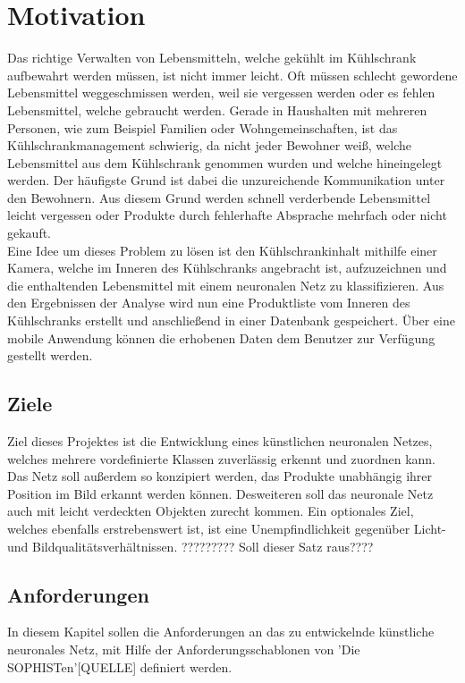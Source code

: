 \documentclass[a4paper,12pt,oneside]{article}
\begin{document}
  \newpage
  
  \tableofcontents
  \newpage
  \listoffigures
 
  
  \newpage
  \pagestyle{plain}
  \setcounter{page}{1}
   
  
  \section{Motivation}
Das richtige Verwalten von Lebensmitteln, welche gekühlt im Kühlschrank aufbewahrt werden müssen, ist nicht immer leicht. Oft müssen schlecht gewordene Lebensmittel weggeschmissen werden, weil sie vergessen werden oder es fehlen Lebensmittel, welche gebraucht werden. Gerade in Haushalten mit mehreren Personen, wie zum Beispiel Familien oder Wohngemeinschaften, ist das Kühlschrankmanagement schwierig, da nicht jeder Bewohner weiß, welche Lebensmittel aus dem Kühlschrank genommen wurden und welche hineingelegt werden. Der häufigste Grund ist dabei die unzureichende Kommunikation unter den Bewohnern. Aus diesem Grund werden schnell verderbende Lebensmittel leicht vergessen oder Produkte durch fehlerhafte Absprache mehrfach oder nicht gekauft. \\ Eine Idee um dieses Problem zu lösen ist den Kühlschrankinhalt mithilfe einer Kamera, welche im Inneren des Kühlschranks angebracht ist, aufzuzeichnen und die enthaltenden Lebensmittel mit einem neuronalen Netz zu klassifizieren. Aus den Ergebnissen der Analyse wird nun eine Produktliste vom Inneren des Kühlschranks erstellt und anschließend in einer Datenbank gespeichert. Über eine mobile Anwendung können die erhobenen Daten dem Benutzer zur Verfügung gestellt werden.
  
  \subsection{Ziele} 
Ziel dieses Projektes ist die Entwicklung eines künstlichen neuronalen Netzes, welches mehrere vordefinierte Klassen zuverlässig erkennt und zuordnen kann. Das Netz soll außerdem so konzipiert werden, das Produkte unabhängig ihrer Position im Bild erkannt werden können. Desweiteren soll das neuronale Netz auch mit leicht verdeckten Objekten zurecht kommen. Ein optionales Ziel, welches ebenfalls erstrebenswert ist, ist eine Unempfindlichkeit gegenüber Licht- und Bildqualitätsverhältnissen.  ????????? Soll dieser Satz raus????

\newpage
	
  \subsection{Anforderungen}
In diesem Kapitel sollen die Anforderungen an das zu entwickelnde künstliche neuronales Netz, mit Hilfe der Anforderungsschablonen von 'Die SOPHISTen'[QUELLE] definiert werden. 
  
\end{document}
